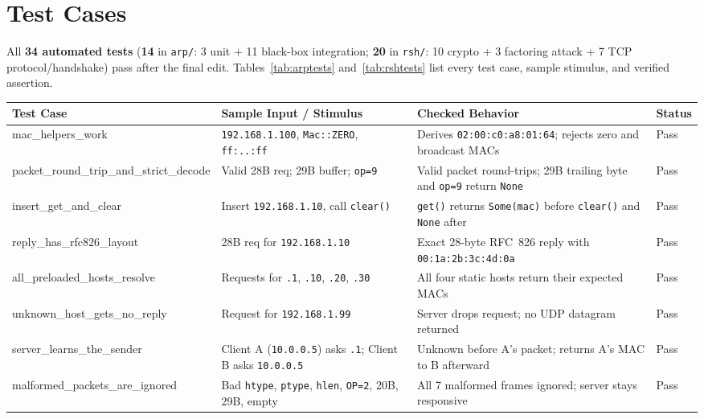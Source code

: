 \documentclass[11pt,a4paper]{article}
\begin{document}
\section{Test Cases}

All \textbf{34 automated tests} (\textbf{14} in \texttt{arp/}: 3 unit + 11 black-box integration; \textbf{20} in \texttt{rsh/}: 10 crypto + 3 factoring attack + 7 TCP protocol/handshake) pass after the final edit. Tables~\ref{tab:arptests} and~\ref{tab:rshtests} list every test case, sample stimulus, and verified assertion.

\begin{table}[H]
\centering
\footnotesize
\begin{tabularx}{\textwidth}{@{}>{\ttfamily\scriptsize}l X X l@{}}
\toprule
\normalfont\textbf{Test Case} & \textbf{Sample Input / Stimulus} & \textbf{Checked Behavior} & \textbf{Status} \\
\midrule
mac\_helpers\_work & \texttt{192.168.1.100}, \texttt{Mac::ZERO}, \texttt{ff:..:ff} & Derives \texttt{02:00:c0:a8:01:64}; rejects zero and broadcast MACs & Pass \\
packet\_round\_trip\_and\_strict\_decode & Valid 28B req; 29B buffer; \texttt{op=9} & Valid packet round-trips; 29B trailing byte and \texttt{op=9} return \texttt{None} & Pass \\
insert\_get\_and\_clear & Insert \texttt{192.168.1.10}, call \texttt{clear()} & \texttt{get()} returns \texttt{Some(mac)} before \texttt{clear()} and \texttt{None} after & Pass \\
reply\_has\_rfc826\_layout & 28B req for \texttt{192.168.1.10} & Exact 28-byte RFC~826 reply with \texttt{00:1a:2b:3c:4d:0a} & Pass \\
all\_preloaded\_hosts\_resolve & Requests for \texttt{.1}, \texttt{.10}, \texttt{.20}, \texttt{.30} & All four static hosts return their expected MACs & Pass \\
unknown\_host\_gets\_no\_reply & Request for \texttt{192.168.1.99} & Server drops request; no UDP datagram returned & Pass \\
server\_learns\_the\_sender & Client A (\texttt{10.0.0.5}) asks \texttt{.1}; Client B asks \texttt{10.0.0.5} & Unknown before A's packet; returns A's MAC to B afterward & Pass \\
malformed\_packets\_are\_ignored & Bad \texttt{htype}, \texttt{ptype}, \texttt{hlen}, \texttt{OP=2}, 20B, 29B, empty & All 7 malformed frames ignored; server stays responsive & Pass \\

\end{tabularx}
\end{table}
\end{document}
